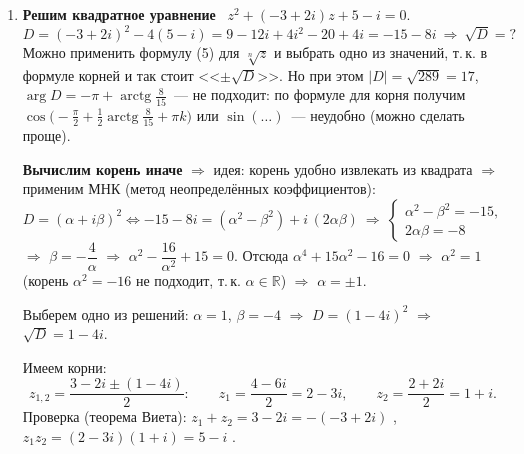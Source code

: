 \documentclass[a4paper,11pt]{article}
\newcommand{\rarctg}{\operatorname{arctg}}
\newcommand{\Rez}{\operatorname{Re}}
\newcommand{\Imz}{\operatorname{Im}}
\begin{document}
\begin{enumerate}[label=\arabic*.]
\begin{minipage}[c]{0.5\linewidth}
\medskip
Изобразим эти числа на комплексной плоскости $\mathbb C$: они~--- вершины квадрата.
\end{minipage}\hfill
\begin{minipage}[c]{0.44\linewidth}
\centering
{}
\end{minipage}

\item \textbf{Решим квадратное уравнение} \ $z^2+(-3+2i)z+5-i=0$.
\[
D=(-3+2i)^2-4(5-i)=9-12i+4i^2-20+4i=-15-8i\ \Rightarrow\ \sqrt D=?
\]
Можно применить формулу (5) для $\sqrt[n]z$ и выбрать одно из значений, т.\,к. в формуле корней и так
стоит <<$\pm\sqrt D$>>. Но при этом $|D|=\sqrt{289}=17$, \ $\arg D=-\pi+\rarctg\frac8{15}$~--- не
подходит: по формуле для корня получим $\cos\bigl(-\frac\pi2+\frac12\rarctg\frac8{15}+\pi k\bigr)$
или $\sin(\ldots)$~--- неудобно (можно сделать проще).

\textbf{Вычислим корень иначе} $\Rightarrow$ идея: корень удобно извлекать из квадрата $\Rightarrow$
применим МНК (метод неопределённых коэффициентов):
\[
D=(\alpha+i\beta)^2\iff-15-8i=(\alpha^2-\beta^2)+i\,(2\alpha\beta)
\ \Rightarrow\
\begin{cases}\alpha^2-\beta^2=-15,\\2\alpha\beta=-8\end{cases}
\]
$\Rightarrow$ $\beta=-\dfrac4\alpha$ $\Rightarrow$ $\alpha^2-\dfrac{16}{\alpha^2}+15=0$.
Отсюда $\alpha^4+15\alpha^2-16=0$ $\Rightarrow$ $\alpha^2=1$ (корень $\alpha^2=-16$ не подходит, т.\,к.
$\alpha\in\mathbb R$) $\Rightarrow$ $\alpha=\pm1$.

Выберем одно из решений: $\alpha=1$, $\beta=-4$ $\Rightarrow$ $D=(1-4i)^2$ $\Rightarrow$ $\sqrt D=1-4i$.

Имеем корни:
\[
z_{1,2}=\frac{3-2i\pm(1-4i)}{2}:\qquad z_1=\frac{4-6i}{2}=2-3i,\qquad z_2=\frac{2+2i}{2}=1+i.
\]
Проверка (теорема Виета): $z_1+z_2=3-2i=-(-3+2i)$ \checkmark, \ $z_1z_2=(2-3i)(1+i)=5-i$ \checkmark.


\end{enumerate}
\end{document}
